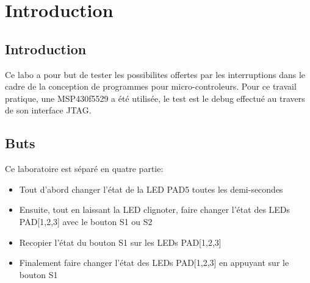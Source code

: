 \section*{Introduction}

\subsection*{Introduction}
Ce labo a pour but de tester les possibilites offertes par les interruptions dans le cadre de la conception de programmes pour micro-controleurs.
Pour ce travail pratique, une MSP430f5529 a été utilisée, le test est le debug effectué au travers de son interface JTAG.

\subsection{Buts}
Ce laboratoire est séparé en quatre partie:
\begin{itemize}
\item Tout d'abord changer l'état de la LED PAD5 toutes les demi-secondes
\item Ensuite, tout en laissant la LED clignoter, faire changer l'état des LEDs PAD[1,2,3] avec le bouton S1 ou S2
\item Recopier l'état du bouton S1 sur les LEDs PAD[1,2,3]
\item Finalement faire changer l'état des LEDs PAD[1,2,3] en appuyant sur le bouton S1
\end{itemize}
